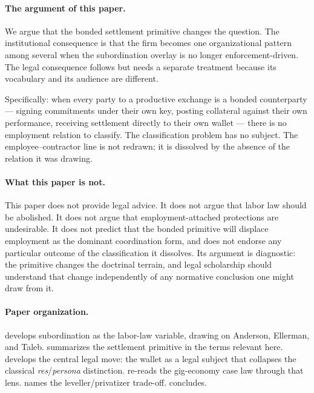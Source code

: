 \documentclass[11pt,a4paper]{article}
\theoremstyle{remark}
\begin{document}
\paragraph{The argument of this paper.}
We argue that the bonded settlement primitive changes the
question. The institutional consequence is that the firm becomes
one organizational pattern among several when the subordination
overlay is no longer enforcement-driven. The legal consequence
follows but needs a separate treatment because its vocabulary
and its audience are different.

Specifically: when every party to a productive exchange is a bonded
counterparty --- signing commitments under their own key, posting
collateral against their own performance, receiving settlement
directly to their own wallet --- there is no employment relation
to classify. The classification problem has no subject. The
employee--contractor line is not redrawn; it is dissolved by the
absence of the relation it was drawing.

\paragraph{What this paper is not.}
This paper does not provide legal advice. It does not argue that
labor law should be abolished. It does not argue that
employment-attached protections are undesirable. It does not
predict that the bonded primitive will displace employment as the
dominant coordination form, and does not endorse any particular
outcome of the classification it dissolves. Its argument is
diagnostic: the primitive changes the doctrinal terrain, and
legal scholarship should understand that change independently of
any normative conclusion one might draw from it.

\paragraph{Paper organization.}
 develops subordination as the
labor-law variable, drawing on Anderson, Ellerman, and Taleb.
 summarizes the settlement primitive in the
terms relevant here.  develops the central legal
move: the wallet as a legal subject that collapses the classical
\emph{res}/\emph{persona} distinction.  re-reads the
gig-economy case law through that lens.
 names the leveller/privatizer trade-off.
 concludes.

\end{document}
